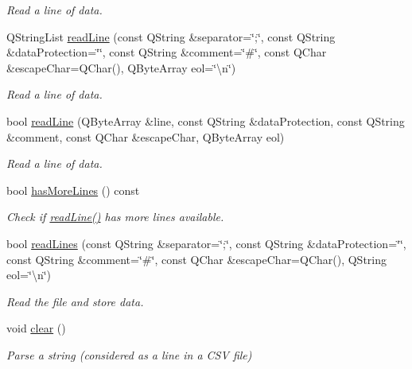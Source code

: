 \begin{DoxyCompactItemize}
\begin{DoxyCompactList}\small\item\em Read a line of data. \end{DoxyCompactList}\item 
Q\-String\-List \hyperlink{classmdt_csv_file_a0c16f0024802eb675872aef129317eb8}{read\-Line} (const Q\-String \&separator=\char`\"{};\char`\"{}, const Q\-String \&data\-Protection=\char`\"{}\char`\"{}, const Q\-String \&comment=\char`\"{}\#\char`\"{}, const Q\-Char \&escape\-Char=Q\-Char(), Q\-Byte\-Array eol=\char`\"{}\textbackslash{}n\char`\"{})
\begin{DoxyCompactList}\small\item\em Read a line of data. \end{DoxyCompactList}\item 
bool \hyperlink{classmdt_csv_file_a56c5d054c044cba2e4d617f5185a13ed}{read\-Line} (Q\-Byte\-Array \&line, const Q\-String \&data\-Protection, const Q\-String \&comment, const Q\-Char \&escape\-Char, Q\-Byte\-Array eol)
\begin{DoxyCompactList}\small\item\em Read a line of data. \end{DoxyCompactList}\item 
bool \hyperlink{classmdt_csv_file_a1e8fa47acbbbf4e5fc7715e80e20d59b}{has\-More\-Lines} () const 
\begin{DoxyCompactList}\small\item\em Check if \hyperlink{classmdt_csv_file_aa7d5e7ab9d6d71f7ca1c9fe7bea043a3}{read\-Line()} has more lines available. \end{DoxyCompactList}\item 
bool \hyperlink{classmdt_csv_file_adeb771789de28feb5c1ec326b179e83b}{read\-Lines} (const Q\-String \&separator=\char`\"{};\char`\"{}, const Q\-String \&data\-Protection=\char`\"{}\char`\"{}, const Q\-String \&comment=\char`\"{}\#\char`\"{}, const Q\-Char \&escape\-Char=Q\-Char(), Q\-String eol=\char`\"{}\textbackslash{}n\char`\"{})
\begin{DoxyCompactList}\small\item\em Read the file and store data. \end{DoxyCompactList}\item 
void \hyperlink{classmdt_csv_file_afe815d4fbdc08c442c9b1dce447cda75}{clear} ()
\begin{DoxyCompactList}\small\item\em Parse a string (considered as a line in a C\-S\-V file) \end{DoxyCompactList}\item 

\end{DoxyCompactItemize}

